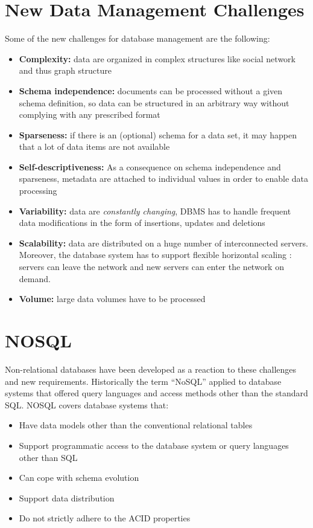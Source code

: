 \section{New Data Management Challenges}
Some of the new challenges for database management are the
following:
\begin{itemize}
    \item \textbf{Complexity:} data are organized in complex structures like social network and thus graph structure
    \item \textbf{Schema independence:} documents can be processed without a given schema definition, so data can be structured in an arbitrary way without complying with any prescribed format
    \item \textbf{Sparseness:} if there is an (optional) schema for a data set, it may happen that a lot of data items are not available
    \item \textbf{Self-descriptiveness:} As a consequence on schema independence and sparseness, metadata are attached to individual values in order to enable data processing
    \item \textbf{Variability:} data are \textit{constantly changing}, DBMS has to handle frequent data modifications in the form of insertions, updates and deletions
    \item \textbf{Scalability:} data are distributed on a huge number of interconnected servers. Moreover, the database system has to support flexible horizontal scaling : servers can leave the network and new servers can enter the network on demand.
    \item \textbf{Volume:} large data volumes have to be processed
\end{itemize}

\section{NOSQL}
Non-relational databases have been developed as a reaction to these challenges and new requirements. Historically the term “NoSQL” applied to database systems that offered query languages and access methods other than the standard SQL. NOSQL covers database systems that:
\begin{itemize}
    \item Have data models other than the conventional relational tables
    \item Support programmatic access to the database system or query languages other than SQL
    \item Can cope with schema evolution
    \item Support data distribution
    \item Do not strictly adhere to the ACID properties
\end{itemize}